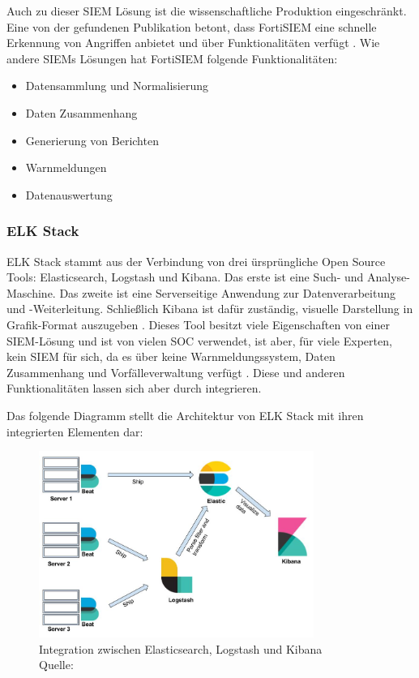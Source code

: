 \newpage
Auch zu dieser \gls{SIEM} Lösung ist die wissenschaftliche Produktion eingeschränkt. Eine von der gefundenen Publikation betont, dass FortiSIEM eine schnelle Erkennung von Angriffen  anbietet und über  Funktionalitäten verfügt \citep{Ramires_fortisiem}. Wie andere \glspl{SIEM} Lösungen hat FortiSIEM folgende Funktionalitäten:

\begin{itemize}[noitemsep]
   \item Datensammlung und Normalisierung
   \item Daten Zusammenhang
   \item Generierung von Berichten
   \item Warnmeldungen
   \item Datenauswertung 
\end{itemize}

\subsubsection{ELK Stack}
ELK Stack stammt aus der Verbindung von drei ürsprüngliche \gls{Open Source} Tools: Elasticsearch, Logstash und Kibana. Das erste ist eine Such- und Analyse-Maschine. Das zweite ist eine Serverseitige Anwendung zur Datenverarbeitung und -Weiterleitung. Schließlich Kibana \label{kibana} ist dafür zuständig, visuelle Darstellung in Grafik-Format auszugeben \citep{packt_elkstack}. Dieses Tool besitzt viele Eigenschaften von einer \gls{SIEM}-Lösung und ist von vielen \gls{SOC} verwendet, ist aber, für viele Experten, kein \gls{SIEM} für sich, da es über keine Warnmeldungssystem, Daten Zusammenhang und Vorfälleverwaltung verfügt \citep{Miller_ELK}. Diese und anderen Funktionalitäten lassen sich aber durch  integrieren. 

\newpage
Das folgende Diagramm stellt die Architektur von ELK Stack mit ihren integrierten Elementen  dar:

\begin{figure}[H]
   \centering
   \includegraphics[width=0.8\textwidth]{assets/2_p8.png}
   \caption{Integration zwischen Elasticsearch, Logstash und Kibana\\Quelle: \citep{packt_elkstack} }
   \centering
\end{figure}

